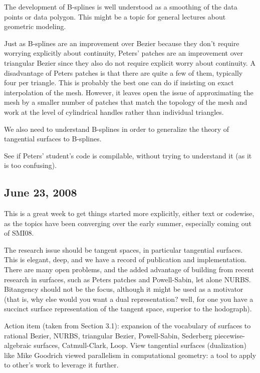 \documentclass[11pt]{article}
\begin{document}
The development of B-splines is well understood as a smoothing of the data points
or data polygon.
This might be a topic for general lectures about geometric modeling.

Just as B-splines are an improvement over Bezier because they don't require worrying explicitly
about continuity, Peters' patches are an improvement over triangular Bezier since they
also do not require explicit worry about continuity.
A disadvantage of Peters patches is that there are quite a few of them, typically four
per triangle.
This is probably the best one can do if insisting on exact interpolation of the mesh.
However, it leaves open the issue of approximating the mesh by a smaller number of patches
that match the topology of the mesh and work at the level of cylindrical handles rather than
individual triangles.

We also need to understand B-splines in order to generalize the theory of tangential surfaces
to B-splines.

See if Peters' student's code is compilable, without trying to understand it
(as it is too confusing).

\subsection{June 23, 2008}

This is a great week to get things started more explicitly, either text or codewise,
as the topics have been converging over the early summer, especially coming out of SMI08.

The research issue should be tangent spaces, in particular tangential surfaces.
This is elegant, deep, and we have a record of publication and implementation.
There are many open problems, and the added advantage of building from recent research
in surfaces, such as Peters patches and Powell-Sabin, let alone NURBS.
Bitangency should not be the focus, although it might be used as a motivator
(that is, why else would you want a dual representation? well, for one you have a succinct
surface representation of the tangent space, superior to the hodograph).

Action item (taken from Section 3.1): 
expansion of the vocabulary of surfaces to rational Bezier, NURBS, triangular Bezier,
Powell-Sabin, Sederberg piecewise-algebraic surfaces, Catmull-Clark, Loop.
View tangential surfaces (dualization) like Mike Goodrich viewed parallelism in
computational geometry: a tool to apply to other's work to leverage it further.
\end{document}
